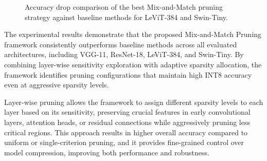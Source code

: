 \documentclass[11pt, conference]{IEEEtran}
\begin{document}
\begin{figure}[!htbp]
\centering
{}
\caption{Accuracy drop comparison of the best Mix-and-Match pruning strategy against baseline methods for LeViT-384 and Swin-Tiny.}
\label{fig:levit_swin_bar}
\end{figure}


The experimental results demonstrate that the proposed Mix-and-Match Pruning framework consistently outperforms baseline methods across all evaluated architectures, including VGG-11, ResNet-18, LeViT-384, and Swin-Tiny. By combining layer-wise sensitivity exploration with adaptive sparsity allocation, the framework identifies pruning configurations that maintain high INT8 accuracy even at aggressive sparsity levels.  

Layer-wise pruning allows the framework to assign different sparsity levels to each layer based on its sensitivity, preserving crucial features in early convolutional layers, attention heads, or residual connections while aggressively pruning less critical regions. This approach results in higher overall accuracy compared to uniform or single-criterion pruning, and it provides fine-grained control over model compression, improving both performance and robustness.  
\end{document}
